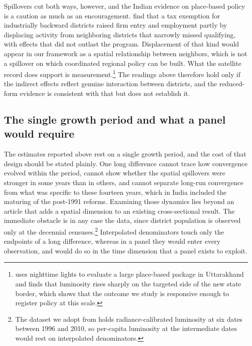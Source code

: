 \documentclass[
  a4paper, 
  twoside,
  final
]{article}
\begin{document}
Spillovers cut both ways, however, and the Indian evidence on
place-based policy is a caution as much as an encouragement.
\citet{hasan_etal_backward_districts} find that a tax exemption for
industrially backward districts raised firm entry and employment partly
by displacing activity from neighboring districts that narrowly missed
qualifying, with effects that did not outlast the program. Displacement
of that kind would appear in our framework as a spatial relationship
between neighbors, which is not a spillover on which coordinated
regional policy can be built. What the satellite record does support is
measurement.\footnote{\citet{shenoy_place_based_policy} uses nighttime
  lights to evaluate a large place-based package in Uttarakhand and
  finds that luminosity rises sharply on the targeted side of the new
  state border, which shows that the outcome we study is responsive
  enough to register policy at this scale.} The readings above therefore
hold only if the indirect effects reflect genuine interaction between
districts, and the reduced-form evidence is consistent with that but
does not establish it.

\subsection{The single growth period and what a panel would
require}\label{the-single-growth-period-and-what-a-panel-would-require}

The estimates reported above rest on a single growth period, and the
cost of that design should be stated plainly. One long difference cannot
trace how convergence evolved within the period, cannot show whether the
spatial spillovers were stronger in some years than in others, and
cannot separate long-run convergence from what was specific to these
fourteen years, which in India included the maturing of the post-1991
reforms. Examining those dynamics lies beyond an article that adds a
spatial dimension to an existing cross-sectional result. The immediate
obstacle is in any case the data, since district population is observed
only at the decennial censuses.\footnote{The dataset we adopt from
  \citet{chanda_kabiraj_district_convergence} holds radiance-calibrated
  luminosity at six dates between 1996 and 2010, so per-capita
  luminosity at the intermediate dates would rest on interpolated
  denominators.} Interpolated denominators touch only the endpoints of a
long difference, whereas in a panel they would enter every observation,
and would do so in the time dimension that a panel exists to exploit.
\end{document}

